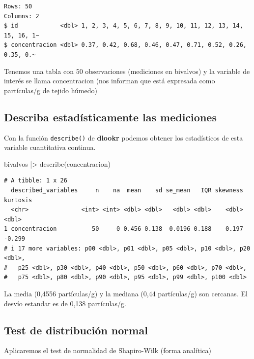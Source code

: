 \documentclass[
  spanish,
  a4paper,
]{scrbook}
\newenvironment{Shaded}{\begin{snugshade}}{\end{snugshade}}
\newcommand{\FunctionTok}[1]{\textcolor[rgb]{0.28,0.35,0.67}{#1}}
\newcommand{\NormalTok}[1]{\textcolor[rgb]{0.00,0.23,0.31}{#1}}
\newcommand{\SpecialCharTok}[1]{\textcolor[rgb]{0.37,0.37,0.37}{#1}}
\begin{document}
\begin{verbatim}
Rows: 50
Columns: 2
$ id            <dbl> 1, 2, 3, 4, 5, 6, 7, 8, 9, 10, 11, 12, 13, 14, 15, 16, 1~
$ concentracion <dbl> 0.37, 0.42, 0.68, 0.46, 0.47, 0.71, 0.52, 0.26, 0.35, 0.~
\end{verbatim}

Tenemos una tabla con 50 observaciones (mediciones en bivalvos) y la
variable de interés se llama concentracion (nos informan que está
expresada como partículas/g de tejido húmedo)

\subsection{Describa estadísticamente las
mediciones}\label{describa-estaduxedsticamente-las-mediciones}

Con la función \texttt{describe()} de \textbf{dlookr} podemos obtener
los estadísticos de esta variable cuantitativa continua.

\begin{Shaded}
\begin{Highlighting}[]
\NormalTok{bivalvos }\SpecialCharTok{|\textgreater{}}
  \FunctionTok{describe}\NormalTok{(concentracion)}
\end{Highlighting}
\end{Shaded}

\begin{verbatim}
# A tibble: 1 x 26
  described_variables     n    na  mean    sd se_mean   IQR skewness kurtosis
  <chr>               <int> <int> <dbl> <dbl>   <dbl> <dbl>    <dbl>    <dbl>
1 concentracion          50     0 0.456 0.138  0.0196 0.188    0.197   -0.299
# i 17 more variables: p00 <dbl>, p01 <dbl>, p05 <dbl>, p10 <dbl>, p20 <dbl>,
#   p25 <dbl>, p30 <dbl>, p40 <dbl>, p50 <dbl>, p60 <dbl>, p70 <dbl>,
#   p75 <dbl>, p80 <dbl>, p90 <dbl>, p95 <dbl>, p99 <dbl>, p100 <dbl>
\end{verbatim}

La media (0,4556 partículas/g) y la mediana (0,44 partículas/g) son
cercanas. El desvío estandar es de 0,138 partículas/g.

\subsection{Test de distribución
normal}\label{test-de-distribuciuxf3n-normal}

Aplicaremos el test de normalidad de Shapiro-Wilk (forma analítica)

\begin{Shaded}
\end{Shaded}
\end{document}
